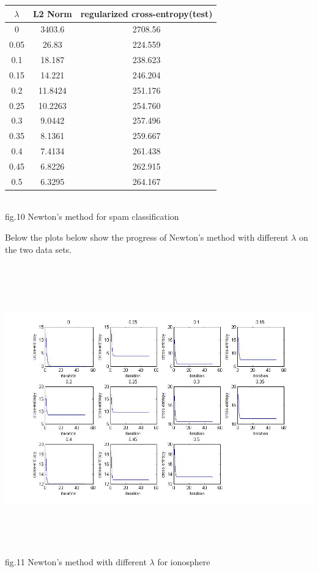 \documentclass[12pt]{article}
\newenvironment{problem}[2][Problem]{\begin{trivlist}
\item[\hskip \labelsep {\bfseries #1}\hskip \labelsep {\bfseries #2}]}{\end{trivlist}}
\begin{document}
\begin{problem} {3.2 Newton's Method}
\begin{center}
	\begin{tabular}{||c c c||} 
		\hline
	   	$\lambda$ & L2 Norm  & regularized cross-entropy(test) \\
		\hline
		0    &  3403.6 & 2708.56\\
		\hline
		0.05 &   26.83 & 224.559\\
		\hline
		0.1  &  18.187 & 238.623\\
		\hline
		0.15 &  14.221 & 246.204\\
		\hline
		0.2  & 11.8424 & 251.176\\
		\hline
		0.25 & 10.2263 & 254.760\\
		\hline
		0.3  & 9.0442  & 257.496\\
		\hline
		0.35 & 8.1361  & 259.667\\
		\hline
		0.4  & 7.4134  & 261.438\\
		\hline
		0.45 & 6.8226  & 262.915\\
		\hline
		0.5  & 6.3295  & 264.167\\
		\hline
	\end{tabular}
	{\\fig.10 Newton's method for spam classification}
\end{center}
Below the plots below show the progress of Newton's method with different $\lambda$ on the two data sets.
\begin{center}
		\includegraphics[height=12.5cm]{newtons_ionosphere.jpg}{\\fig.11 Newton's method with different $\lambda$ for ionosphere}

\end{center}
\end{problem}
\end{document}
